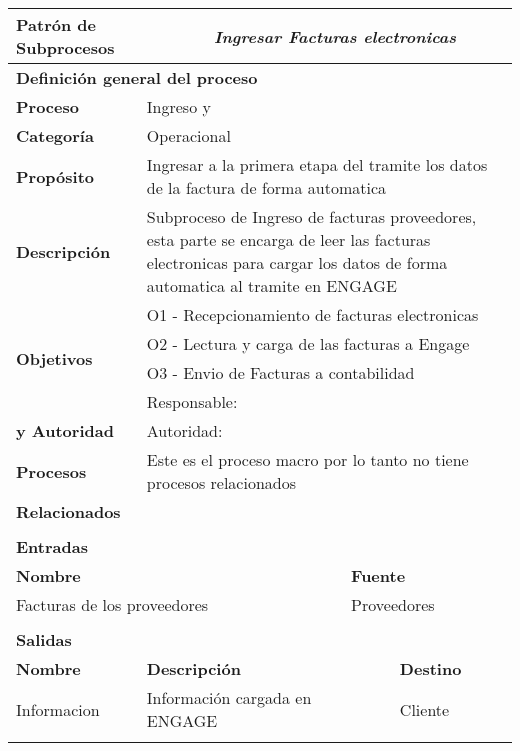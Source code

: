 \begin{longtable}{|llrrrrrr|}
	\hline
	\multicolumn{2}{|l|}{\textbf{Patrón de Subprocesos}} & \multicolumn{6}{|l|}{\textit{Ingresar Facturas electronicas}} \\ \hline
	\multicolumn{8}{|l|}{\textbf{Definición general del proceso}} \\ \hline
	\textbf{Proceso} & \multicolumn{7}{|m{12cm}|}{Ingreso y} \\ \hline
	\textbf{Categoría} & \multicolumn{7}{|m{12cm}|}{Operacional} \\ \hline
	\textbf{Propósito} & \multicolumn{7}{|m{12cm}|}{Ingresar a la primera etapa del tramite los datos de la factura de forma automatica} \\ \hline
    \textbf{Descripción} & \multicolumn{7}{|m{12cm}|}{Subproceso de Ingreso de facturas proveedores, esta parte se encarga de leer las facturas electronicas para cargar los datos de forma automatica al tramite en ENGAGE} \\ \hline
	\multirow{4}[6]{*}{\textbf{Objetivos}} 
		  & \multicolumn{7}{|l|}{O1 - Recepcionamiento de facturas electronicas} \\ \cline{2-8}
          & \multicolumn{7}{|l|}{O2 - Lectura y carga de las facturas a Engage } \\ \cline{2-8}
          & \multicolumn{7}{|l|}{O3 -  Envio de Facturas a contabilidad} \\ \hline
    \multicolumn{1}{|l|}{\textbf{Responsabilidad}} 	& \multicolumn{7}{|l|}{Responsable: } \\
	\multicolumn{1}{|l|}{\textbf{y Autoridad}} 	& \multicolumn{7}{|l|}{Autoridad: } \\ \hline
    \multicolumn{1}{|l|}{\textbf{Procesos}} 	& \multicolumn{7}{|l|}{Este es el proceso macro por lo tanto no tiene procesos relacionados} \\
	\multicolumn{1}{|l|}{\textbf{Relacionados}} 	&  \multicolumn{7}{|l|}{} \\ \hline
          &       &       &       &       &       &       &  \\ \hline
    \multicolumn{8}{|l|}{\textbf{Entradas}} \\ \hline
    \multicolumn{5}{|l|}{\textbf{Nombre}}   & \multicolumn{3}{|l|}{\textbf{Fuente}} \\ \hline
    \multicolumn{5}{|l|}{Facturas de los proveedores} & \multicolumn{3}{|l|}{Proveedores} \\  \hline
       &       &       &       &       &       &       &  \\ \hline
    \multicolumn{8}{|l|}{\textbf{Salidas}} \\ \hline
    \textbf{Nombre} & \multicolumn{5}{|l|}{\textbf{Descripción}} & \multicolumn{2}{|l|}{\textbf{Destino}} \\ \hline
    Informacion & \multicolumn{5}{|l|}{Información cargada en ENGAGE} & \multicolumn{2}{|l|}{Cliente} \\ \hline
       &       &       &       &       &       &       &  \\ \hline
	

\end{longtable}
